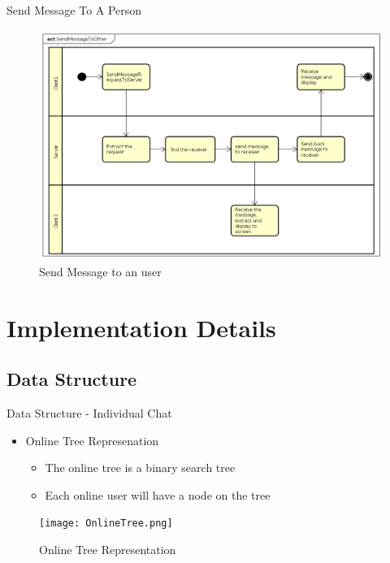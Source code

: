 \documentclass{beamer}
\begin{document}
\begin{frame}{Send Message To A Person}
\begin{center}
	\begin{figure}
		\includegraphics[scale=0.3]{SendMessageToOther.png}
		\caption{Send Message to an user}
	\end{figure}
\end{center}
\end{frame}
 
\section{Implementation Details}
\subsection{Data Structure}
\begin{frame}{Data Structure - Individual Chat}

\begin{itemize}
	\item Online Tree Represenation
	\begin{itemize}
		\item The online tree is a binary search tree
		\item Each online user will have a node on the tree
	\end{itemize}
\end{itemize}

\begin{center}
	\begin{figure}
		\texttt{[image: OnlineTree.png]}
		\caption{Online Tree Representation}
	\end{figure}
\end{center}
\end{frame}
\end{document}
